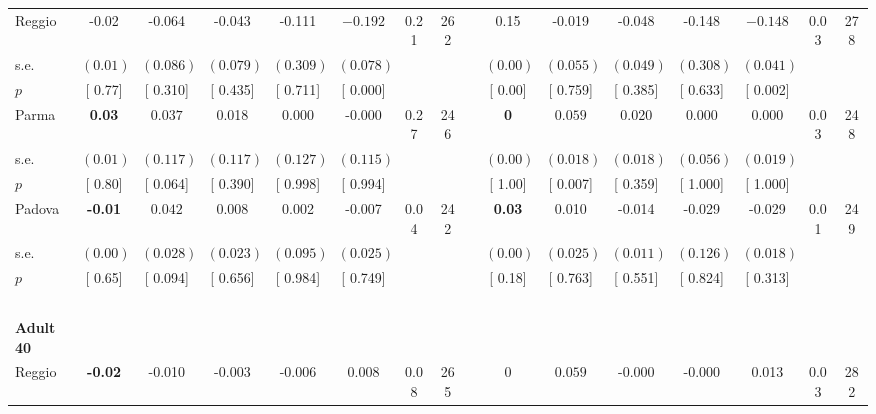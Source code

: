 \begin{longtable}{L{8em} c c c c c c c p{1em} c c c c c c c}
\quad \quad \quad Reggio& -0.02 &    -0.064 &    -0.043 &    -0.111 & $ \mathbf{   -0.192}$ &      0.21 &       262 & & 0.15 &    -0.019 &    -0.048 &    -0.148 & $ \mathbf{   -0.148}$ &      0.03 &       278  \\*
\quad \quad \quad \quad s.e.& $ (     0.01)$ & $ (    0.086)$ & $ (    0.079)$ & $ (    0.309)$ & $ (    0.078)$ & & & & $ (     0.00)$ & $ (    0.055)$ & $ (    0.049)$ & $ (    0.308)$ & $ (    0.041)$ & &  \\*
\quad \quad \quad \quad $ p$ & [     0.77] & [    0.310] & [    0.435] & [    0.711] & [    0.000] & & & & [     0.00] & [    0.759] & [    0.385] & [    0.633] & [    0.002] & &  \\[1em]
\quad \quad \quad Parma& \textbf{     0.03} & $ \mathbf{    0.037}$ &     0.018 &     0.000 &    -0.000 &      0.27 &       246 & & \textbf{0} & $ \mathbf{    0.059}$ &     0.020 &     0.000 &     0.000 &      0.03 &       248  \\*
\quad \quad \quad \quad s.e.& $ (     0.01)$ & $ (    0.117)$ & $ (    0.117)$ & $ (    0.127)$ & $ (    0.115)$ & & & & $ (     0.00)$ & $ (    0.018)$ & $ (    0.018)$ & $ (    0.056)$ & $ (    0.019)$ & &  \\*
\quad \quad \quad \quad $ p$ & [     0.80] & [    0.064] & [    0.390] & [    0.998] & [    0.994] & & & & [     1.00] & [    0.007] & [    0.359] & [    1.000] & [    1.000] & &  \\[1em]
\quad \quad \quad Padova& \textbf{    -0.01} & $ \mathbf{    0.042}$ &     0.008 &     0.002 &    -0.007 &      0.04 &       242 & & \textbf{     0.03} &     0.010 &    -0.014 &    -0.029 &    -0.029 &      0.01 &       249  \\*
\quad \quad \quad \quad s.e.& $ (     0.00)$ & $ (    0.028)$ & $ (    0.023)$ & $ (    0.095)$ & $ (    0.025)$ & & & & $ (     0.00)$ & $ (    0.025)$ & $ (    0.011)$ & $ (    0.126)$ & $ (    0.018)$ & &  \\*
\quad \quad \quad \quad $ p$ & [     0.65] & [    0.094] & [    0.656] & [    0.984] & [    0.749] & & & & [     0.18] & [    0.763] & [    0.551] & [    0.824] & [    0.313] & &  \\[1em]
~\\[1em]
\quad \quad \textbf{Adult 40} & & & & & & & & & & & & & & & \\* 
\quad \quad \quad Reggio& \textbf{    -0.02} &    -0.010 &    -0.003 &    -0.006 &     0.008 &      0.08 &       265 & & 0 & $ \mathbf{    0.059}$ &    -0.000 &    -0.000 &     0.013 &      0.03 &       282  \\*

\end{longtable}
